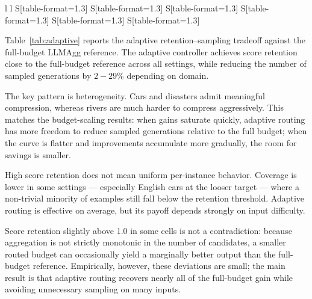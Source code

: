 \documentclass[11pt]{article}
\begin{document}
\begin{CJK*}{UTF8}{gbsn}
\begin{table}
{\begin{tabular}{
l l
S[table-format=1.3]
S[table-format=1.3]
S[table-format=1.3]
S[table-format=1.3]
S[table-format=1.3]
S[table-format=1.3]
}
\bottomrule
\end{tabular}%
}
\caption{Adaptive retention--sampling tradeoff evaluated against the full-budget LLMAgg reference at $\operatorname{K}_{\text{full}}\!=\!99$. \textbf{Savings}: relative reduction in sampled generations. \textbf{Retention}: ratio of adaptive to full-budget score. \textbf{Coverage}: fraction of examples meeting the retention target. Point estimates are shown. %
    }
\label{tab:adaptive}
\end{table}

Table~\ref{tab:adaptive} reports the adaptive retention--sampling tradeoff against the full-budget LLMAgg reference. The adaptive controller achieves score retention close to the full-budget reference across all settings, while reducing the number of sampled generations by $2\!-\!29$\% depending on domain.

The key pattern is heterogeneity. Cars and disasters admit meaningful compression, whereas rivers are much harder to compress aggressively. This matches the budget-scaling results: when gains saturate quickly, adaptive routing has more freedom to reduce sampled generations relative to the full budget; when the curve is flatter and improvements accumulate more gradually, the room for savings is smaller.

High score retention does not mean uniform per-instance behavior. Coverage is lower in some settings — especially English cars at the looser target — where a non-trivial minority of examples still fall below the retention threshold. Adaptive routing is effective on average, but its payoff depends strongly on input difficulty.

Score retention slightly above 1.0 in some cells is not a contradiction: because aggregation is not strictly monotonic in the number of candidates, a smaller routed budget can occasionally yield a marginally better output than the full-budget reference. Empirically, however, these deviations are small; the main result is that adaptive routing recovers nearly all of the full-budget gain while avoiding unnecessary sampling on many inputs.


\end{CJK*}
\end{document}
